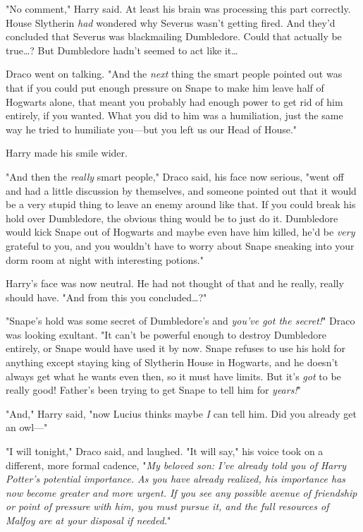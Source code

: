 "No comment," Harry said. At least his brain was processing this part 
correctly. House Slytherin \emph{had} wondered why Severus wasn't getting 
fired. And they'd concluded that Severus was blackmailing Dumbledore. Could 
that actually be true{\ldots}? But Dumbledore hadn't seemed to act like 
it{\ldots}

Draco went on talking. "And the \emph{next} thing the smart people pointed out 
was that if you could put enough pressure on Snape to make him leave half of 
Hogwarts alone, that meant you probably had enough power to get rid of him 
entirely, if you wanted. What you did to him was a humiliation, just the same 
way he tried to humiliate you---but you left us our Head of House."

Harry made his smile wider.

"And then the \emph{really} smart people," Draco said, his face now serious, 
"went off and had a little discussion by themselves, and someone pointed out 
that it would be a very stupid thing to leave an enemy around like that. If you 
could break his hold over Dumbledore, the obvious thing would be to just do it. 
Dumbledore would kick Snape out of Hogwarts and maybe even have him killed, 
he'd be \emph{very} grateful to you, and you wouldn't have to worry about Snape 
sneaking into your dorm room at night with interesting potions."

Harry's face was now neutral. He had not thought of that and he really, really 
should have. "And from this you concluded{\ldots}?"

"Snape's hold was some secret of Dumbledore's and \emph{you've got the 
secret!}" Draco was looking exultant. "It can't be powerful enough to destroy 
Dumbledore entirely, or Snape would have used it by now. Snape refuses to use 
his hold for anything except staying king of Slytherin House in Hogwarts, and 
he doesn't always get what he wants even then, so it must have limits. But it's 
\emph{got} to be really good! Father's been trying to get Snape to tell him for 
\emph{years!}"

"And," Harry said, "now Lucius thinks maybe \emph{I} can tell him. Did you 
already get an owl---"

"I will tonight," Draco said, and laughed. "It will say," his voice took on a 
different, more formal cadence, "\emph{My beloved son: I've already told you of 
Harry Potter's potential importance. As you have already realized, his 
importance has now become greater and more urgent. If you see any possible 
avenue of friendship or point of pressure with him, you must pursue it, and the 
full resources of Malfoy are at your disposal if needed.}"

